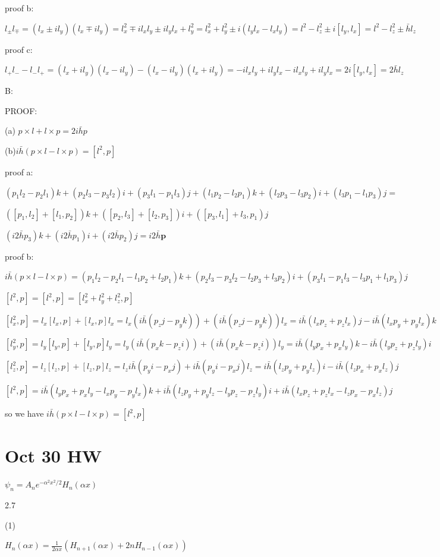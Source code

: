 \documentclass{article}
\begin{document}
proof b:

$l_\pm l_\mp=(l_x\pm il_y)(l_x\mp il_y)=l_x^2\mp il_xl_y\pm il_yl_x+l_y^2=l_x^2+l_y^2\pm i(l_yl_x-l_xl_y)=l^2-l_z^2\pm i[l_y,l_x]=l^2-l_z^2\pm\bar hl_z$

proof c:

$l_+l_--l_-l_+=(l_x+il_y)(l_x-il_y)-(l_x-il_y)(l_x+il_y)=-il_xl_y+il_yl_x-il_xl_y+il_yl_x=2i[l_y,l_x]=2\bar hl_z$

B:

PROOF:

(a) $p\times l +l\times p = 2i\bar h p$

(b)$i\bar h(p\times l -l\times p)=[l^2,p]$

proof a:

$(p_1l_2-p_2l_1)k+(p_2l_3-p_3l_2)i+(p_3l_1-p_1l_3)j+(l_1p_2-l_2p_1)k+(l_2p_3-l_3p_2)i+(l_3p_1-l_1p_3)j=$

$([p_1,l_2]+[l_1,p_2])k+([p_2,l_3]+[l_2,p_3])i+([p_3,l_1]+l_3,p_1)j$

$(i2\bar hp_3)k+(i2\bar hp_1)i+(i2\bar hp_2)j=i2\bar h\bm{p}$

proof b:

$i\bar h(p\times l-l\times p)=(p_1l_2-p_2l_1-l_1p_2+l_2p_1)k+(p_2l_3-p_3l_2-l_2p_3+l_3p_2)i+(p_3l_1-p_1l_3-l_3p_1+l_1p_3)j$

$[l^2,p]=[l^2,p]=[l_x^2+l_y^2+l_z^2,p]$

$[l_x^2,p]=l_x[l_x,p]+[l_x,p]l_x=l_x(i\bar h(p_zj-p_yk))+(i\bar h(p_zj-p_yk))l_x=i\bar h(l_xp_z+p_zl_x)j-i\bar h(l_xp_y+p_yl_x)k$

$[l_y^2,p]=l_y[l_y,p]+[l_y,p]l_y=l_y(i\bar h(p_xk-p_zi))+(i\bar h(p_xk-p_zi))l_y=i\bar h(l_yp_x+p_xl_y)k-i\bar h(l_yp_z+p_zl_y)i$

$[l_z^2,p]=l_z[l_z,p]+[l_z,p]l_z=l_z{i\bar h(p_yi-p_xj)}+i\bar h(p_yi-p_xj)l_z=i\bar h(l_zp_y+p_yl_z)i-i\bar h(l_zp_x+p_xl_z)j$

$[l^2,p]=i\bar h(l_yp_x+p_xl_y-l_xp_y-p_yl_x)k+i\bar h(l_zp_y+p_yl_z-l_yp_z-p_zl_y)i+i\bar h(l_xp_z+p_zl_x-l_zp_x-p_xl_z)j$

so we have $i\bar h(p\times l-l\times p)=[l^2,p]$

\section{Oct 30 HW}

$\psi_n=A_ne^{-\alpha^2x^2/2}H_n(\alpha x)$

2.7

(1)

$H_n(\alpha x)=\frac1{2\alpha x}(H_{n+1}(\alpha x)+2nH_{n-1}(\alpha x))$
\end{document}
